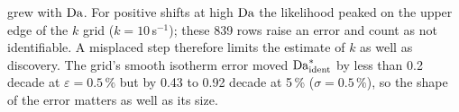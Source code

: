 grew with $\mathrm{Da}$. For positive shifts at high $\mathrm{Da}$ the likelihood peaked on the upper edge of the
$k$ grid ($k = 10$\,s$^{-1}$); these 839 rows raise an error and count as not identifiable.
A misplaced step therefore limits the estimate of $k$ as well as discovery. The grid's smooth
isotherm error moved $\mathrm{Da}^{*}_{\mathrm{ident}}$ by less than 0.2 decade at $\varepsilon = 0.5\,\%$
but by 0.43 to 0.92 decade at 5\,\% ($\sigma = 0.5\,\%$), so the shape of the error matters as
well as its size.

